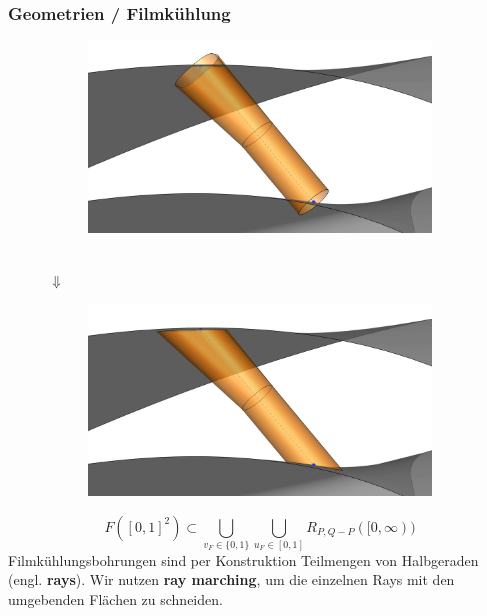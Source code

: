 \documentclass[8pt, aspectratio=169]{beamer}
\begin{document}
\begin{frame}
	\frametitle{Geometrien / Filmkühlung}
	\vspace{-0.5cm}
	\centering
	\begin{minipage}[t]{.4\textwidth}
		\begin{figure}[H]
			\centering
			\begin{subfigure}{\textwidth}
				\includegraphics[width=\textwidth]{../../tec/holes/20edit.png}
			\end{subfigure}\\
			$\Downarrow$\\
			\begin{subfigure}{\textwidth}
				\includegraphics[width=\textwidth]{../../tec/holes/21edit.png}
			\end{subfigure}
		\end{figure}
	\end{minipage}
	\begin{minipage}[t]{.55\textwidth}
		\vspace{-0.5cm}
		\centering
		$$ F([0,1]^2) \subset \bigcup_{v_F \in \{0,1\}}\bigcup_{u_F\in[0,1]} R_{P,Q-P}([0, \infty)) $$
		Filmkühlungsbohrungen sind per Konstruktion Teilmengen von Halbgeraden (engl. \textbf{rays}).
		Wir nutzen \textbf{ray marching}, um die einzelnen Rays mit den umgebenden Flächen zu schneiden.
		\begin{figure}[H]
			\centering
			
		\end{figure}
	\end{minipage}
	\vfill
\end{frame}
\end{document}
